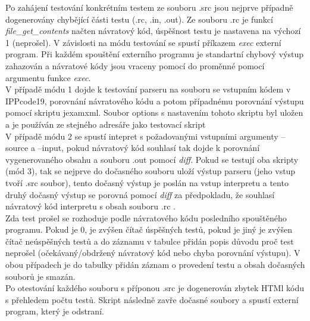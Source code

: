 \documentclass[10pt]{article}
\begin{document}
Po zahájení testování konkrétním testem ze souboru .src jsou nejprve případně dogenerovány chybějící části testu (.rc, .in, .out). Ze souboru .rc je funkcí  \textit{file\_get\_contents} načten návratový kód, úspěšnost testu je nastavena na výchozí 1 (neprošel). V závislosti na módu testování se spustí příkazem \textit{exec} externí program. Při každém spouštění externího programu je standartní chybový výstup zahazován a návratové kódy jsou vraceny pomocí do proměnné pomocí argumentu funkce \textit{exec}.\\V případě módu 1 dojde k testování parseru na souboru se vstupním kódem v IPPcode19, porovnání návratového kódu a potom případnému porovnání výstupu pomocí skriptu jexamxml. Soubor options s nastavením tohoto skriptu byl uložen a je používán ze stejného adresáře jako testovací skript\\V případě módu 2 se spustí intepret s požadovanými vstupními argumenty --source a --input, pokud návratový kód souhlasí tak dojde k porovnání vygenerovaného obsahu a souboru .out pomocí \textit{diff}. Pokud se testují oba skripty (mód 3), tak se nejprve do dočasného souboru uloží výstup parseru (jeho vstup tvoří .src soubor), tento dočasný výstup je poslán na vstup interpretu a tento druhý dočasný výstup se porovná pomocí \textit{diff} za předpokladu, že souhlasí návratový kód interpretu s obsah souboru .rc .\\
Zda test prošel se rozhoduje podle návratového kódu posledního spouštěného programu. Pokud je 0, je zvýšen čítač úspěšných testů, pokud je jiný je zvýšen čítač neúspěšných testů a do záznamu v tabulce přidán popis důvodu proč test neprošel (očekávaný/obdržený návratový kód nebo chyba porovnání výstupu). V obou případech je do tabulky přidán záznam o provedení testu a obsah dočasných souborů je smazán.\\
Po otestování každého souboru s příponou .src je dogenerován zbytek HTMl kódu s přehledem počtu testů. Skript následně zavře dočasné soubory a spustí externí program, který je odstraní.
\end{document}

